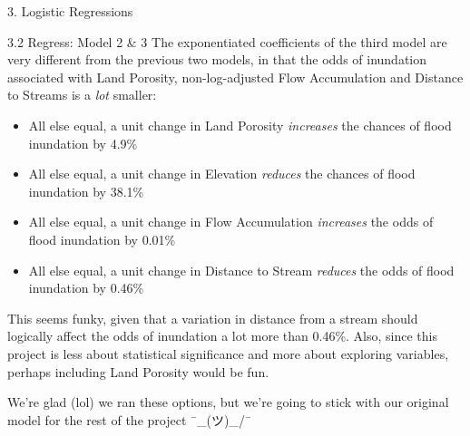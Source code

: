 \documentclass[
  ignorenonframetext,
]{beamer}
\newenvironment{Shaded}{\begin{snugshade}}{\end{snugshade}}
\newcommand{\DecValTok}[1]{\textcolor[rgb]{0.00,0.00,0.81}{#1}}
\newcommand{\DocumentationTok}[1]{\textcolor[rgb]{0.56,0.35,0.01}{\textbf{\textit{#1}}}}
\newcommand{\FloatTok}[1]{\textcolor[rgb]{0.00,0.00,0.81}{#1}}
\newcommand{\FunctionTok}[1]{\textcolor[rgb]{0.00,0.00,0.00}{#1}}
\newcommand{\NormalTok}[1]{#1}
\newcommand{\OtherTok}[1]{\textcolor[rgb]{0.56,0.35,0.01}{#1}}
\newcommand{\SpecialCharTok}[1]{\textcolor[rgb]{0.00,0.00,0.00}{#1}}
\newcommand{\StringTok}[1]{\textcolor[rgb]{0.31,0.60,0.02}{#1}}
\providecommand{\tightlist}{%
  \setlength{\itemsep}{0pt}\setlength{\parskip}{0pt}}
\begin{document}
\begin{frame}[fragile]{3. Logistic Regressions}
\begin{block}{3.2 Regress: Model 2 \& 3}
The exponentiated coefficients of the third model are very different
from the previous two models, in that the odds of inundation associated
with Land Porosity, non-log-adjusted Flow Accumulation and Distance to
Streams is a \emph{lot} smaller:

\begin{itemize}
\tightlist
\item
  All else equal, a unit change in Land Porosity \emph{increases} the
  chances of flood inundation by 4.9\%
\item
  All else equal, a unit change in Elevation \emph{reduces} the chances
  of flood inundation by 38.1\%
\item
  All else equal, a unit change in Flow Accumulation \emph{increases}
  the odds of flood inundation by 0.01\%
\item
  All else equal, a unit change in Distance to Stream \emph{reduces} the
  odds of flood inundation by 0.46\%
\end{itemize}

This seems funky, given that a variation in distance from a stream
should logically affect the odds of inundation a lot more than 0.46\%.
Also, since this project is less about statistical significance and more
about exploring variables, perhaps including Land Porosity would be fun.

We're glad (lol) we ran these options, but we're going to stick with our
original model for the rest of the project ¯\_(ツ)\_/¯

\begin{Shaded}
\end{Shaded}
\end{block}
\end{frame}
\end{document}
